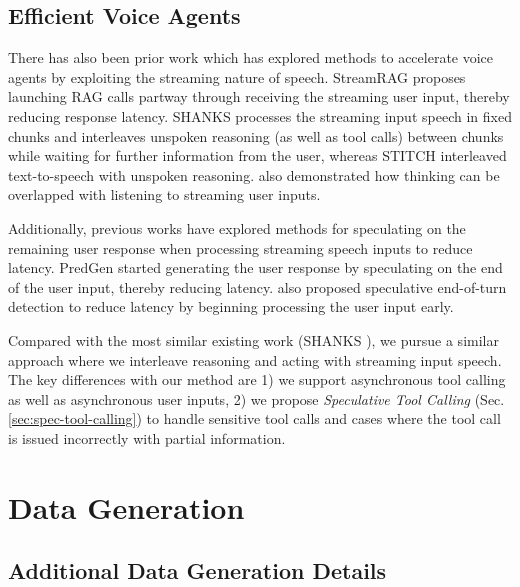 \subsection{Efficient Voice Agents}

There has also been prior work which has explored methods to accelerate voice agents by exploiting the streaming nature of speech.
StreamRAG \citep{arora2025stream} proposes launching RAG calls partway through receiving the streaming user input, thereby reducing response latency.
SHANKS \citep{chiang2025shanks} processes the streaming input speech in fixed chunks and interleaves unspoken reasoning (as well as tool calls) between chunks while waiting for further information from the user, whereas STITCH \citep{chiang2025stitch} interleaved text-to-speech with unspoken reasoning.
\citep{shih2025can} also demonstrated how thinking can be overlapped with listening to streaming user inputs. 

Additionally, previous works have explored methods for speculating on the remaining user response when processing streaming speech inputs to reduce latency.
PredGen \citep{li2025predgen} started generating the user response by speculating on the end of the user input, thereby reducing latency. 
\citep{ok2025speculative} also proposed speculative end-of-turn detection to reduce latency by beginning processing the user input early.

Compared with the most similar existing work (SHANKS \citep{chiang2025shanks}), we pursue a similar approach where we interleave reasoning and acting with streaming input speech. 
The key differences with our method are 1) we support asynchronous tool calling as well as asynchronous user inputs, 2) we propose \textit{Speculative Tool Calling} (Sec. \ref{sec:spec-tool-calling}) to handle sensitive tool calls and cases where the tool call is issued incorrectly with partial information. 

\section{Data Generation}
\label{sec:appendix_data_generation}

\subsection{Additional Data Generation Details}

